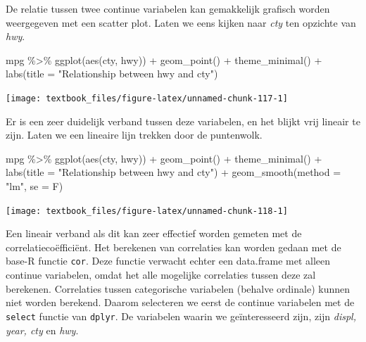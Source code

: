 \documentclass[]{tufte-book}
\newenvironment{Shaded}{}{}
\newcommand{\AttributeTok}[1]{\textcolor[rgb]{0.49,0.56,0.16}{#1}}
\newcommand{\FunctionTok}[1]{\textcolor[rgb]{0.02,0.16,0.49}{#1}}
\newcommand{\NormalTok}[1]{#1}
\newcommand{\SpecialCharTok}[1]{\textcolor[rgb]{0.25,0.44,0.63}{#1}}
\newcommand{\StringTok}[1]{\textcolor[rgb]{0.25,0.44,0.63}{#1}}
\begin{document}
De relatie tussen twee continue variabelen kan gemakkelijk grafisch worden weergegeven met een scatter plot. Laten we eens kijken naar \emph{cty} ten opzichte van \emph{hwy}.

\begin{Shaded}
\begin{Highlighting}[]
\NormalTok{mpg }\SpecialCharTok{\%\textgreater{}\%}
  \FunctionTok{ggplot}\NormalTok{(}\FunctionTok{aes}\NormalTok{(cty, hwy)) }\SpecialCharTok{+}
  \FunctionTok{geom\_point}\NormalTok{() }\SpecialCharTok{+}
  \FunctionTok{theme\_minimal}\NormalTok{() }\SpecialCharTok{+}
  \FunctionTok{labs}\NormalTok{(}\AttributeTok{title =} \StringTok{"Relationship between hwy and cty"}\NormalTok{)}
\end{Highlighting}
\end{Shaded}

\texttt{[image: textbook\_files/figure-latex/unnamed-chunk-117-1]}

Er is een zeer duidelijk verband tussen deze variabelen, en het blijkt vrij lineair te zijn. Laten we een lineaire lijn trekken door de puntenwolk.

\begin{Shaded}
\begin{Highlighting}[]
\NormalTok{mpg }\SpecialCharTok{\%\textgreater{}\%}
  \FunctionTok{ggplot}\NormalTok{(}\FunctionTok{aes}\NormalTok{(cty, hwy)) }\SpecialCharTok{+}
  \FunctionTok{geom\_point}\NormalTok{() }\SpecialCharTok{+}
  \FunctionTok{theme\_minimal}\NormalTok{() }\SpecialCharTok{+}
  \FunctionTok{labs}\NormalTok{(}\AttributeTok{title =} \StringTok{"Relationship between hwy and cty"}\NormalTok{) }\SpecialCharTok{+}
  \FunctionTok{geom\_smooth}\NormalTok{(}\AttributeTok{method =} \StringTok{"lm"}\NormalTok{, }\AttributeTok{se =}\NormalTok{ F)}
\end{Highlighting}
\end{Shaded}

\texttt{[image: textbook\_files/figure-latex/unnamed-chunk-118-1]}

Een lineair verband als dit kan zeer effectief worden gemeten met de correlatiecoëfficiënt. Het berekenen van correlaties kan worden gedaan met de base-R functie \texttt{cor}. Deze functie verwacht echter een data.frame met alleen continue variabelen, omdat het alle mogelijke correlaties tussen deze zal berekenen. Correlaties tussen categorische variabelen (behalve ordinale) kunnen niet worden berekend. Daarom selecteren we eerst de continue variabelen met de \texttt{select} functie van \texttt{dplyr}. De variabelen waarin we geïnteresseerd zijn, zijn \emph{displ, year, cty} en \emph{hwy}.
\end{document}

